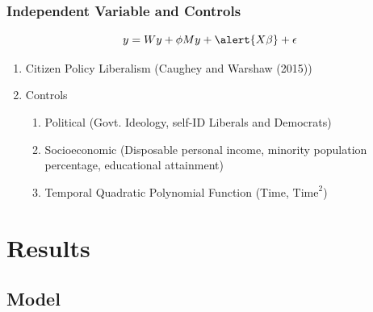 \documentclass{beamer}
\begin{document}
\begin{frame}
	\frametitle{Independent Variable and Controls}
		\[y=Wy+\phi My+\alert{X\beta}+\epsilon\]
		\begin{enumerate}
			\item Citizen Policy Liberalism (Caughey and Warshaw (2015))
			\item Controls
			\begin{enumerate}
				\item Political (Govt. Ideology, self-ID Liberals and Democrats)
				\item Socioeconomic (Disposable personal income, minority population percentage, educational attainment)
				\item Temporal Quadratic Polynomial Function (Time, $\mbox{Time}^2$)
			\end{enumerate}
		\end{enumerate}
\end{frame}

\section{Results}
\subsection{Model}
\end{document}
